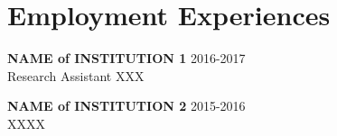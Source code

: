 
\section{Employment Experiences}
\vspace{-0.25in}
\begin{outerlist}
	\item \textbf{NAME of INSTITUTION 1} \hfill 2016-2017 \\
	Research Assistant XXX
	\item \textbf{NAME of INSTITUTION 2} \hfill 2015-2016 \\
	XXXX
\end{outerlist}
